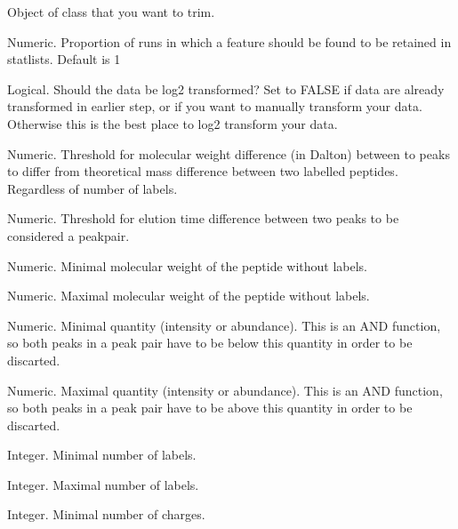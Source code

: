 \documentclass[letterpaper]{book}
\begin{document}
\begin{Arguments}
\begin{ldescription}
\item[\code{pepmatched\_object}] Object of class  that you want to trim.

\item[\code{cutoff}] Numeric. Proportion of runs in which a feature should be found to be retained in statlists. Default is 1

\item[\code{logtransform}] Logical. Should the data be log2 transformed? Set to FALSE if data are already transformed in earlier step, or if you want to manually transform your data. Otherwise this is the best place to log2 transform your data.

\item[\code{labelthresh}] Numeric. Threshold for molecular weight difference (in Dalton) between to peaks to differ from theoretical mass difference between two labelled peptides. Regardless of number of labels.

\item[\code{elutionthresh}] Numeric. Threshold for elution time difference between two peaks to be considered a peakpair.

\item[\code{MWmin}] Numeric. Minimal molecular weight of the peptide without labels.

\item[\code{MWmax}] Numeric. Maximal molecular weight of the peptide without labels.

\item[\code{quantmin}] Numeric. Minimal quantity (intensity or abundance). This is an AND function, so both peaks in a peak pair have to be below this quantity in order to be discarted.

\item[\code{quantmax}] Numeric. Maximal quantity (intensity or abundance). This is an AND function, so both peaks in a peak pair have to be above this quantity in order to be discarted.

\item[\code{labelcountmin}] Integer. Minimal number of labels.

\item[\code{labelcountmax}] Integer. Maximal number of labels.

\item[\code{zmin}] Integer. Minimal number of charges.


\end{ldescription}
\end{Arguments}
\end{document}
